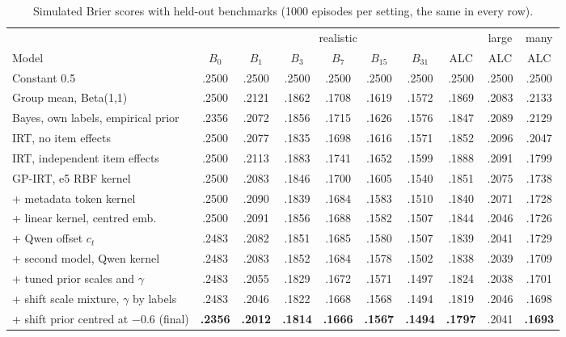 \documentclass{article}
\begin{document}
\begin{table}[t]
\centering\small
\caption{Simulated Brier scores with held-out benchmarks (1000 episodes per setting, the same in every row).}
\label{tab:main}
\setlength{\tabcolsep}{3pt}
\begin{tabular}{lccccccc|cc}
\toprule
& \multicolumn{7}{c|}{realistic} & large & many \\
Model & $B_0$ & $B_1$ & $B_3$ & $B_7$ & $B_{15}$ & $B_{31}$ & ALC & ALC & ALC \\
\midrule
Constant 0.5 & .2500 & .2500 & .2500 & .2500 & .2500 & .2500 & .2500 & .2500 & .2500 \\
Group mean, Beta(1,1) & .2500 & .2121 & .1862 & .1708 & .1619 & .1572 & .1869 & .2083 & .2133 \\
Bayes, own labels, empirical prior & .2356 & .2072 & .1856 & .1715 & .1626 & .1576 & .1847 & .2089 & .2129 \\
IRT, no item effects & .2500 & .2077 & .1835 & .1698 & .1616 & .1571 & .1852 & .2096 & .2047 \\
IRT, independent item effects & .2500 & .2113 & .1883 & .1741 & .1652 & .1599 & .1888 & .2091 & .1799 \\
GP-IRT, e5 RBF kernel & .2500 & .2083 & .1846 & .1700 & .1605 & .1540 & .1851 & .2075 & .1738 \\
\quad + metadata token kernel & .2500 & .2090 & .1839 & .1684 & .1583 & .1510 & .1840 & .2071 & .1728 \\
\quad + linear kernel, centred emb. & .2500 & .2091 & .1856 & .1688 & .1582 & .1507 & .1844 & .2046 & .1726 \\
\quad + Qwen offset $c_t$ & .2483 & .2082 & .1851 & .1685 & .1580 & .1507 & .1839 & .2041 & .1729 \\
\quad + second model, Qwen kernel & .2483 & .2083 & .1852 & .1684 & .1578 & .1502 & .1838 & .2039 & .1709 \\
\quad + tuned prior scales and $\gamma$ & .2483 & .2055 & .1829 & .1672 & .1571 & .1497 & .1824 & .2038 & .1701 \\
\quad + shift scale mixture, $\gamma$ by labels & .2483 & .2046 & .1822 & .1668 & .1568 & .1494 & .1819 & .2046 & .1698 \\
\quad + shift prior centred at $-0.6$ (final) & \textbf{.2356} & \textbf{.2012} & \textbf{.1814} & \textbf{.1666} & \textbf{.1567} & \textbf{.1494} & \textbf{.1797} & .2041 & \textbf{.1693} \\
\bottomrule
\end{tabular}
\end{table}
\end{document}
